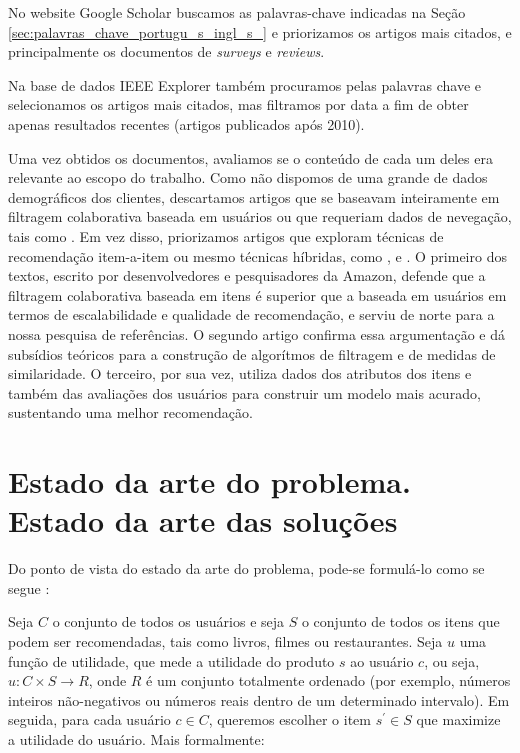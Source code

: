 No website Google Scholar buscamos as palavras-chave indicadas na Seção \ref{sec:palavras_chave_portugu_s_ingl_s_} e priorizamos os artigos mais citados, e principalmente os documentos de \textit{surveys} e \textit{reviews}.

Na base de dados IEEE Explorer também procuramos pelas palavras chave e selecionamos os artigos mais citados, mas filtramos por data a fim de obter apenas resultados recentes (artigos publicados após 2010).

Uma vez obtidos os documentos, avaliamos se o conteúdo de cada um deles era relevante ao escopo do trabalho. Como não dispomos de uma grande de dados demográficos dos clientes, descartamos artigos que se baseavam inteiramente em filtragem colaborativa baseada em usuários ou que requeriam dados de nevegação, tais como \cite{adibi2013collaborative}. Em vez disso, priorizamos artigos que exploram técnicas de recomendação item-a-item ou mesmo técnicas híbridas, como \cite{linden2003amazon}, \cite{sarwar2001item} e \cite{puntheeranurak2011item}. O primeiro dos textos, escrito por desenvolvedores e pesquisadores da Amazon, defende que a filtragem colaborativa baseada em itens é superior que a baseada em usuários em termos de escalabilidade e qualidade de recomendação, e serviu de norte para a nossa pesquisa de referências. O segundo artigo confirma essa argumentação e dá subsídios teóricos para a construção de algorítmos de filtragem e de medidas de similaridade. O terceiro, por sua vez, utiliza dados dos atributos dos itens e também das avaliações dos usuários para construir um modelo mais acurado, sustentando uma melhor recomendação.

\section{Estado da arte do problema. \\ Estado da arte das soluções} %
\label{sec:estado_da_arte_do_problema_estado_da_arte_das_solu_es}

Do ponto de vista do estado da arte do problema, pode-se formulá-lo como se segue \cite{adomavicius2005toward}: 

Seja $C$ o conjunto de todos os usuários e seja $S$ o conjunto de todos os itens que podem ser recomendadas, tais como livros, filmes ou restaurantes. Seja $u$ uma função de utilidade, que mede a utilidade do produto $s$ ao usuário $c$, ou seja, $u: C \times S \rightarrow R$, onde $R$ é um  conjunto totalmente ordenado (por exemplo, números inteiros não-negativos ou números reais dentro de um determinado intervalo). Em seguida, para cada usuário $c \in C$, queremos escolher o item $ s^\prime \in S $ que maximize a utilidade do usuário. Mais formalmente:

